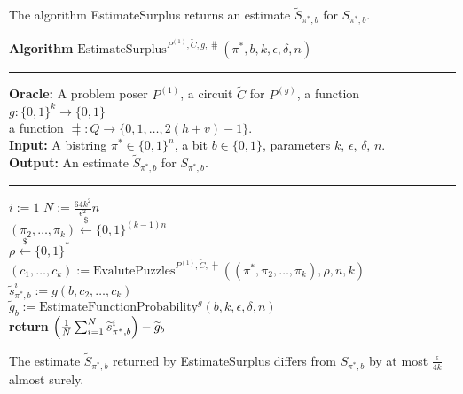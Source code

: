 The algorithm EstimateSurplus returns an estimate $\widetilde{S}_{\pi^*, b}$ for $S_{\pi^*, b}$.
%
\begin{codeblock}
  \textbf{Algorithm} $\text{EstimateSurplus}^{P^{(1)}, \widetilde{C}, g, \hash}(\pi^*, b, k, \epsilon, \delta, n)$
  \medskip
  \hrule
  \medskip
  \textbf{Oracle:} A problem poser $P^{(1)}$, a circuit $\widetilde{C}$ for $P^{(g)}$, a function $g: \{0,1\}^{k} \rightarrow \{0,1\}$ \\
  \IndII a function $\hash : Q \rightarrow \{0,1,\dots, 2(h+v)-1\}$.\\
  \textbf{Input:} A bistring $\pi^* \in \{0,1\}^{n}$, a bit $b \in \{0,1\}$, parameters $k$, $\epsilon$, $\delta$, $n$.\\
  \textbf{Output:} An estimate $\widetilde{S}_{\pi^*, b}$ for $S_{\pi^*, b}$.
  \medskip\hrule\medskip
  \For $i:=1$ \To $N := \frac{64k^2}{\epsilon^2}n$ \Do \\
  \IndI $(\pi_{2}, \dots, \pi_k) \xleftarrow{\$} \{0,1\}^{(k-1)n}$\\
  \IndI $\rho \xleftarrow{\$} \{0,1\}^{*}$\\
  \IndI $(c_1, \dots, c_k) := \text{EvalutePuzzles}^{P^{(1)}, \widetilde{C}, \hash}((\pi^*, \pi_2, \dots, \pi_k), \rho, n, k)$\\
  \IndI $\widetilde{s}_{\pi^*,b}^i := g(b, c_{2}, \dots, c_k)$\\
  $\widetilde{g}_b := \text{EstimateFunctionProbability}^{g}(b, k, \epsilon, \delta, n)$ \\
  \textbf{return} $\Bigl(\frac{1}{N} \sum_{i=1}^N \widetilde{s}_{\pi^*,b}^i \Bigr) - \widetilde{g}_b$\\
\end{codeblock}
%
\begin{lemma}
  \label{lemma:surplus_estimate}
The estimate $\widetilde{S}_{\pi^*,b}$ returned by EstimateSurplus differs from $S_{\pi^*, b}$ by at most $\frac{\epsilon}{4k}$ almost surely.
\end{lemma}

